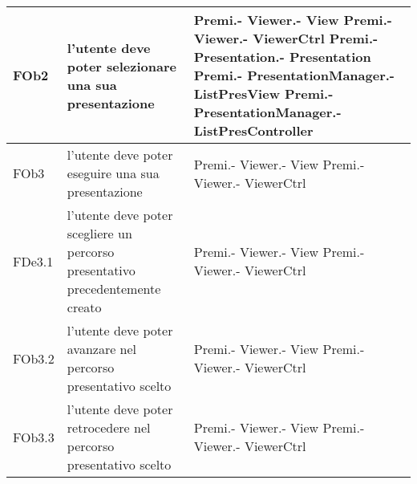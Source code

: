 \begin{longtable}{|l|p{5cm}|p{4cm}|}
FOb2 & l'utente deve poter selezionare una sua presentazione & Premi.- \linebreak Viewer.- \linebreak View \linebreak Premi.- \linebreak Viewer.- \linebreak ViewerCtrl \linebreak Premi.- \linebreak Presentation.- \linebreak Presentation \linebreak Premi.- \linebreak PresentationManager.- \linebreak ListPresView \linebreak Premi.- \linebreak PresentationManager.- \linebreak ListPresController \linebreak \\
\hline
FOb3 & l'utente deve poter eseguire una sua presentazione & Premi.- \linebreak Viewer.- \linebreak View \linebreak Premi.- \linebreak Viewer.- \linebreak ViewerCtrl \linebreak \\
\hline
FDe3.1 & l'utente deve poter scegliere un percorso presentativo precedentemente creato & Premi.- \linebreak Viewer.- \linebreak View \linebreak Premi.- \linebreak Viewer.- \linebreak ViewerCtrl \linebreak \\
\hline
FOb3.2 & l'utente deve poter avanzare nel percorso presentativo scelto & Premi.- \linebreak Viewer.- \linebreak View \linebreak Premi.- \linebreak Viewer.- \linebreak ViewerCtrl \linebreak \\
\hline
FOb3.3 & l'utente deve poter retrocedere nel percorso presentativo scelto & Premi.- \linebreak Viewer.- \linebreak View \linebreak Premi.- \linebreak Viewer.- \linebreak ViewerCtrl \linebreak \\

\end{longtable}
